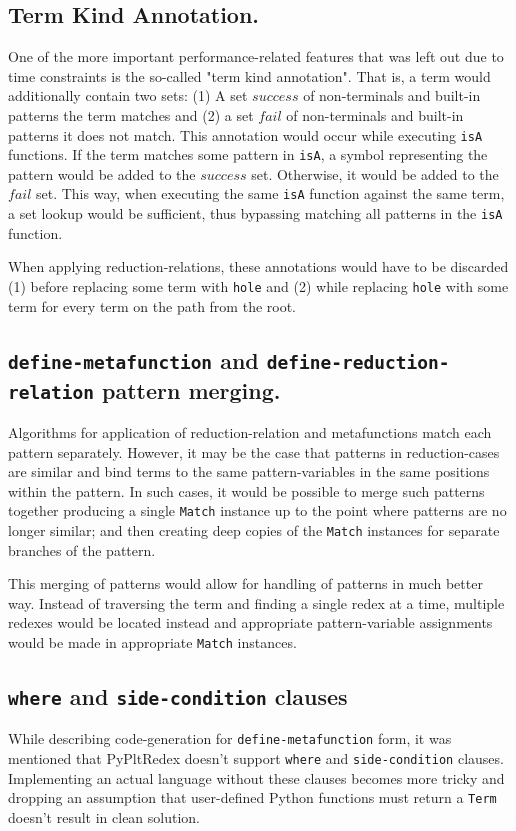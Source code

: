 \subsection{Term Kind Annotation.}
One of the more important performance-related features that was left out due to time constraints is the so-called "term kind annotation". That is, a term would additionally contain two sets: (1) A set $success$ of non-terminals and built-in patterns the term matches and (2) a set $fail$ of non-terminals and built-in patterns it does not match. This annotation would occur while executing \texttt{isA} functions. If the term matches some pattern in \texttt{isA}, a symbol representing the pattern would be added to the $success$ set. Otherwise, it would be added to the $fail$ set. This way, when executing the same \texttt{isA} function against the same term, a set lookup would be sufficient, thus bypassing matching all patterns in the \texttt{isA} function.

When applying reduction-relations, these annotations would have to be discarded (1) before replacing some term with \texttt{hole} and (2) while replacing \texttt{hole} with some term for every term on the path from the root.


\subsection{\texttt{define-metafunction} and \texttt{define-reduction-relation} pattern merging.}

Algorithms for application of reduction-relation and metafunctions match each pattern separately. However, it may be the case that patterns in reduction-cases are similar and bind terms to the same pattern-variables in the same positions within the pattern. In such cases, it would be possible to merge such patterns together producing a single \texttt{Match} instance up to the point where patterns are no longer similar; and then creating deep copies of the \texttt{Match} instances for separate branches of the pattern.

This merging of patterns would allow for handling of \PatternInHoleNoArg patterns in much better way. Instead of traversing the term and finding a single redex at a time, multiple redexes would be located instead and appropriate pattern-variable assignments would be made in appropriate \texttt{Match} instances.

\subsection{\texttt{where} and \texttt{side-condition} clauses}
While describing code-generation for \texttt{define-metafunction} form, it was mentioned that PyPltRedex doesn't support \texttt{where} and \texttt{side-condition} clauses. Implementing an actual language without these clauses becomes more tricky and dropping an assumption that user-defined Python functions must return a \texttt{Term} doesn't result in clean solution.


